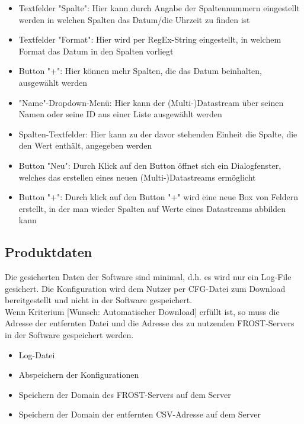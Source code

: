 \documentclass[12 pt]{article}
\begin{document}
\begin{itemize}
\item Textfelder "Spalte": Hier kann durch Angabe der Spaltennummern eingestellt werden in welchen Spalten das Datum/die Uhrzeit zu finden ist
\item Textfelder "Format": Hier wird per RegEx-String eingestellt, in welchem Format das Datum in den Spalten vorliegt
\item Button "+": Hier können mehr Spalten, die das Datum beinhalten, ausgewählt werden

\item "Name"-Dropdown-Menü: Hier kann der (Multi-)Datastream über seinen Namen oder seine ID aus einer Liste ausgewählt werden
\item Spalten-Textfelder: Hier kann zu der davor stehenden Einheit die Spalte, die den Wert enthält, angegeben werden
\item Button "Neu": Durch Klick auf den Button öffnet sich ein Dialogfenster, welches das erstellen eines neuen (Multi-)Datastreams ermöglicht
\item Button "+": Durch klick auf den Button "+" wird eine neue Box von Feldern erstellt, in der man wieder Spalten auf Werte eines Datastreams abbilden kann
\end{itemize}

\subsection{Produktdaten}
Die gesicherten Daten der Software sind minimal, d.h. es wird nur ein Log-File gesichert. Die Konfiguration wird dem Nutzer per CFG-Datei zum Download bereitgestellt und nicht in der Software gespeichert.\\
Wenn Kriterium [Wunsch: Automatischer Download] erfüllt ist, so muss die Adresse der entfernten Datei und die Adresse des zu nutzenden FROST-Servers in der Software gespeichert werden.
\begin{itemize}
\item Log-Datei
\item Abspeichern der Konfigurationen
\item Speichern der Domain des FROST-Servers auf dem Server
\item Speichern der Domain der entfernten CSV-Adresse auf dem Server
\end{itemize}
\end{document}
